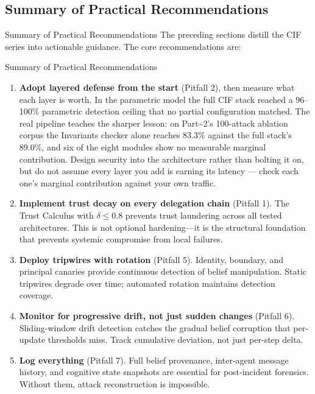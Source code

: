 \documentclass[
  ignorenonframetext,
]{beamer}
\begin{document}
\subsection{Summary of Practical
Recommendations}\label{summary-of-practical-recommendations}

\begin{frame}[allowframebreaks]{Summary of Practical Recommendations}
The preceding sections distill the CIF series into actionable guidance.
The core recommendations are:

\end{frame}

\begin{frame}[allowframebreaks]{Summary of Practical Recommendations}
\begin{enumerate}
\item
  \textbf{Adopt layered defense from the start} (Pitfall 2), then
  measure what each layer is worth. In the parametric model the full CIF
  stack reached a 96--100\% parametric detection ceiling that no partial
  configuration matched. The real pipeline teaches the sharper lesson:
  on Part\textasciitilde2's 100-attack ablation corpus the Invariants
  checker alone reaches 83.3\% against the full stack's 89.0\%, and six
  of the eight modules show no measurable marginal contribution. Design
  security into the architecture rather than bolting it on, but do not
  assume every layer you add is earning its latency --- check each one's
  marginal contribution against your own traffic.
\item
  \textbf{Implement trust decay on every delegation chain} (Pitfall 1).
  The Trust Calculus with \(\delta \leq 0.8\) prevents trust laundering
  across all tested architectures. This is not optional hardening---it
  is the structural foundation that prevents systemic compromise from
  local failures.
\item
  \textbf{Deploy tripwires with rotation} (Pitfall 5). Identity,
  boundary, and principal canaries provide continuous detection of
  belief manipulation. Static tripwires degrade over time; automated
  rotation maintains detection coverage.
\item
  \textbf{Monitor for progressive drift, not just sudden changes}
  (Pitfall 6). Sliding-window drift detection catches the gradual belief
  corruption that per-update thresholds miss. Track cumulative
  deviation, not just per-step delta.
\item
  \textbf{Log everything} (Pitfall 7). Full belief provenance,
  inter-agent message history, and cognitive state snapshots are
  essential for post-incident forensics. Without them, attack
  reconstruction is impossible.
\end{enumerate}
\end{frame}
\end{document}
